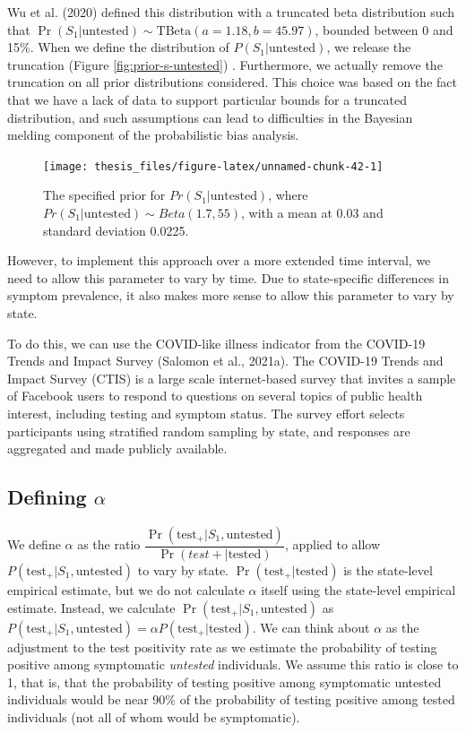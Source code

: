 \documentclass[12pt,twoside]{smiththesis}
\begin{document}
Wu et al. (2020) defined this distribution with a truncated beta distribution such that \(\Pr(S_1|\text{untested}) \sim \text{TBeta}(a = 1.18, b = 45.97)\), bounded between 0 and 15\%. When we define the distribution of \(P(S_1|\text{untested})\), we release the truncation (Figure \ref{fig:prior-s-untested}) . Furthermore, we actually remove the truncation on all prior distributions considered. This choice was based on the fact that we have a lack of data to support particular bounds for a truncated distribution, and such assumptions can lead to difficulties in the Bayesian melding component of the probabilistic bias analysis.
\begin{figure}

{\centering \texttt{[image: thesis\_files/figure-latex/unnamed-chunk-42-1]} 

}

\caption{\label{fig:prior-s-untested}The specified prior for $Pr(S_1|\text{untested})$, where  $Pr(S_1|\text{untested}) \sim Beta(1.7,55)$, with a mean at 0.03 and standard deviation 0.0225.}\label{fig:unnamed-chunk-42}
\end{figure}
However, to implement this approach over a more extended time interval, we need to allow this parameter to vary by time. Due to state-specific differences in symptom prevalence, it also makes more sense to allow this parameter to vary by state.

To do this, we can use the COVID-like illness indicator from the COVID-19 Trends and Impact Survey (Salomon et al., 2021a). The COVID-19 Trends and Impact Survey (CTIS) is a large scale internet-based survey that invites a sample of Facebook users to respond to questions on several topics of public health interest, including testing and symptom status. The survey effort selects participants using stratified random sampling by state, and responses are aggregated and made publicly available.

\hypertarget{defining-alpha}{%
\subsection{\texorpdfstring{Defining \(\alpha\)}{Defining \textbackslash alpha}}\label{defining-alpha}}

We define \(\alpha\) as the ratio \(\dfrac{\Pr(\text{test}_+|S_1, \text{untested})}{\Pr(test+|\text{tested})}\), applied to allow
\(P(\text{test}_+|S_1, \text{untested})\) to vary by state. \(\Pr(\text{test}_+|\text{tested})\) is the state-level empirical estimate, but we do not calculate \(\alpha\) itself using the state-level empirical estimate. Instead, we calculate \(\Pr(\text{test}_+|S_1, \text{untested})\) as \(P(\text{test}_+|S_1, \text{untested}) =\alpha P(\text{test}_+|\text{tested})\). We can think about \(\alpha\) as the adjustment to the test positivity rate as we estimate the probability of testing positive among symptomatic \emph{untested} individuals. We assume this ratio is close to 1, that is, that the probability of testing positive among symptomatic untested individuals would be near 90\% of the probability of testing positive among tested individuals (not all of whom would be symptomatic).
\end{document}
